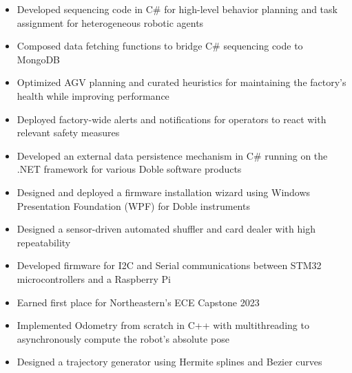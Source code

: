 \documentclass[10pt,a4paper,ragged2e,withhyper]{altacv}
\begin{document}
    \begin{itemize}
        \item Developed sequencing code in C\# for high-level behavior planning and task assignment for heterogeneous robotic agents
        \item Composed data fetching functions to bridge C\# sequencing code to MongoDB
        \item Optimized AGV planning and curated heuristics for maintaining the factory's health while improving performance
        \item Deployed factory-wide alerts and notifications for operators to react with relevant safety measures
    \end{itemize}
    \begin{itemize}
        \item Developed an external data persistence mechanism in C\# running on the .NET framework for various Doble software products
        \item Designed and deployed a firmware installation wizard using Windows Presentation Foundation (WPF) for Doble instruments
    \end{itemize}
    \vspace{-1.45em}
    \begin{itemize}
        \item Designed a sensor-driven automated shuffler and card dealer with high repeatability
        \item Developed firmware for I2C and Serial communications between STM32 microcontrollers and a Raspberry Pi
        \item Earned first place for Northeastern's ECE Capstone 2023
    \end{itemize}
    \begin{itemize}
        \item Implemented Odometry from scratch in C++ with multithreading to asynchronously compute the robot's absolute pose
        \item Designed a trajectory generator using Hermite splines and Bezier curves
    \end{itemize}
\end{document}
